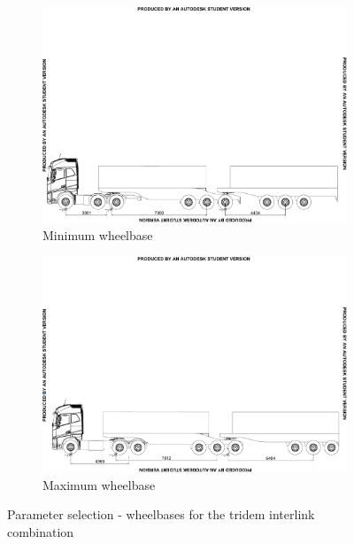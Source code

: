\begin{figure}[!htbp]
	\centering
	\begin{subfigure}[t]{1\textwidth}
		\centering
		\includegraphics[width=1\textwidth]{fig/parameter-selection_wheelbase_min_b-double}
		\caption{Minimum wheelbase}
	\end{subfigure}%

	\begin{subfigure}[t]{1\textwidth}
		\centering
		\includegraphics[width=1\textwidth]{fig/parameter-selection_wheelbase_max_b-double}
		\caption{Maximum wheelbase}
	\end{subfigure}

	\caption{Parameter selection - wheelbases for the tridem interlink combination}
	\label{figure:parameter-selection-wheelbase-b-double}
\end{figure}

